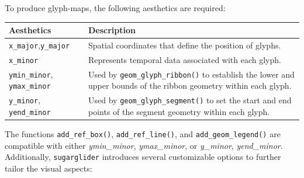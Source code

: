 To produce glyph-maps, the following aesthetics are required:

\begin{longtable}[]{@{}
  >{\raggedright\arraybackslash}p{}
  >{\raggedright\arraybackslash}p{}@{}}
\toprule\noalign{}
\begin{minipage}[b]{\linewidth}\raggedright
Aesthetics
\end{minipage} & \begin{minipage}[b]{\linewidth}\raggedright
Description
\end{minipage} \\
\midrule\noalign{}
\endhead
\bottomrule\noalign{}
\endlastfoot
\texttt{x\_major},\texttt{y\_major} & Spatial coordinates that define the position of glyphs. \\
\texttt{x\_minor} & Represents temporal data associated with each glyph. \\
\texttt{ymin\_minor}, \texttt{ymax\_minor} & Used by \texttt{geom\_glyph\_ribbon()} to establish the lower and upper bounds of the ribbon geometry within each glyph. \\
\texttt{y\_minor}, \texttt{yend\_minor} & Used by \texttt{geom\_glyph\_segment()} to set the start and end points of the segment geometry within each glyph. \\
\end{longtable}

The functions \texttt{add\_ref\_box()}, \texttt{add\_ref\_line()}, and \texttt{add\_geom\_legend()} are compatible with either \emph{ymin\_minor}, \emph{ymax\_minor}, or \emph{y\_minor}, \emph{yend\_minor}. Additionally, \texttt{sugarglider} introduces several customizable options to further tailor the visual aspects:

